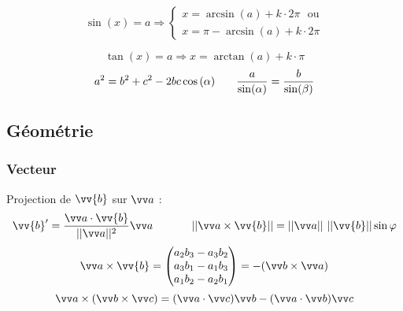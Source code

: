 \documentclass[../main.tex]{subfiles}
\begin{document}
\[
  \sin(x)=a \Rightarrow
  \begin{cases}
    x = \arcsin(a) + k\cdot 2\pi \,\,\,\,\text{ou}\\
    x = \pi - \arcsin(a) + k\cdot 2\pi 
  \end{cases}
\]

\[\tan(x)= a \Rightarrow x = \arctan(a) + k\cdot\pi\]
\[
  a^2 = b^2 + c^2 - 2bc\cos\left(\alpha\right)\phantom{text} \frac{a}{\sin(\alpha)}=\frac{b}{\sin(\beta)} 
\]


\renewcommand{\arraystretch}{1}

\subsection{Géométrie}
\subsubsection{Vecteur}

Projection de \(\vv{b}\) sur \(\ac\) : 
\[
  \vv{b}' = \frac{\ac\cdot\vv{b}}{||\ac||^2}\ac \phantom{texttext} 
  ||\ac\times\vv{b}||=||\ac||\,\,||\vv{b}||\sin\varphi
\]
\[
  \ac\times\vv{b}=\begin{pmatrix}
    a_2b_3 - a_3b_2 \\ 
    a_3b_1 - a_1b_3 \\ 
    a_1b_2 - a_2b_1
  \end{pmatrix}
  =-(\vecb\times\veca)
\]
\[
  \veca\times(\vecb\times\vecc)=(\veca\cdot\vecc)\vecb - (\veca\cdot\vecb)\vecc
\]
\end{document}
